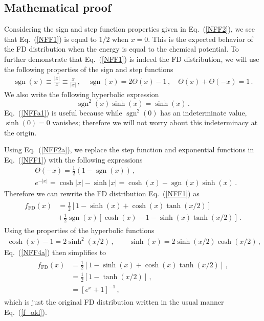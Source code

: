 \documentclass[sn-mathphys,Numbered]{sn-jnl}
\newcommand{\req}[1]{Eq.~(\ref{#1})}
\DeclareMathOperator{\sgn}{sgn}
\begin{document}
\subsection{Mathematical proof}
Considering the sign and step function properties given in \req{NFF2}, we see that \req{NFF1} is equal to $1/2$ when $x=0$. This is the expected behavior of the FD distribution when the energy is equal to the chemical potential. To further demonstrate that \req{NFF1} is indeed the FD distribution, we will use the following properties of the sign and step functions
\begin{align}
\label{NFF2a}
\sgn(x)\equiv\frac{|x|}{x}\equiv\frac{x}{|x|}\,,\quad
\sgn(x)=2\Theta(x)-1\,,\quad
\Theta(x)+\Theta(-x)=1\,.
\end{align}
We also write the following hyperbolic expression
\begin{equation}
\label{NFFa1}
\sgn^{2}(x)\sinh(x)=\sinh(x)\,.
\end{equation}
\req{NFFa1} is useful because while $\sgn^{2}(0)$ has an indeterminate value, $\sinh(0)=0$ vanishes; therefore we will not worry about this indeterminacy at the origin.

Using \req{NFF2a}, we replace the step function and exponential functions in \req{NFF1} with the following expressions
\begin{align}
\label{NFF4}
&\Theta(-x)=\frac 1 2 (1-\sgn(x))\,,\\ 
&e^{-|x|}=\cosh|x|-\sinh|x|=\cosh(x)- \sgn(x)\sinh(x)\,.
\end{align}
Therefore we can rewrite the FD distribution \req{NFF1} as
\begin{align}
\begin{split}
\label{NFF4a}
f_\mathrm{FD}(x)&=\frac{1}{2}\left[1-\sinh(x)+\cosh(x)\tanh(x/2)\right]\\
&+\frac{1}{2}\sgn(x)\left[\cosh(x)-1-\sinh(x)\tanh(x/2)\right]\,.
\end{split}
\end{align}
Using the properties of the hyperbolic functions
\begin{align}
\cosh(x)-1=2\sinh^2(x/2)\,,\qquad
\sinh(x)=2\sinh(x/2)\cosh(x/2)\,,
\end{align}
\req{NFF4a} then simplifies to
\begin{align}
\begin{split}
\label{NFF4b}
f_\mathrm{FD}(x)
&=\frac{1}{2}\left[1-\sinh(x)+\cosh(x)\tanh(x/2)\right]\,,\\
&=\frac{1}{2}\left[1-\tanh(x/2)\right]\,,\\
&=\left[e^{x}+1\right]^{-1}\,,
\end{split}
\end{align}
which is just the original FD distribution written in the usual manner \req{f_old}.
\end{document}
